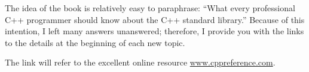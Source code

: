 The idea of the book is relatively easy to paraphrase: “What every professional C++ programmer should know about the C++ standard library.” Because of this intention, I left many answers unanswered; therefore, I provide you with the links to the details at the beginning of each new topic.

The link will refer to the excellent online resource \href{http://en.cppreference.com/w/}{www.cppreference.com}.
